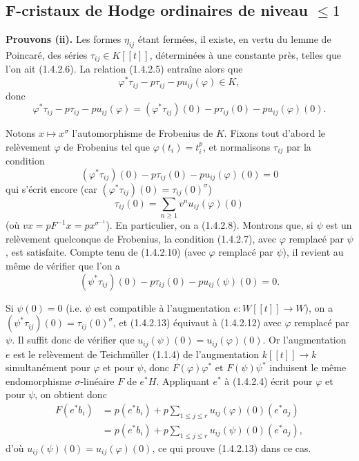 \documentclass[12pt,a4paper]{article}
\theoremstyle{plain}
\theoremstyle{definition}
\theoremstyle{remark}
\begin{document}
\setcounter{section}{1}
\setcounter{subsection}{3}
\setcounter{theorem}{1}

\subsection{F-cristaux de Hodge ordinaires de niveau $\leqslant 1$}

\textbf{Prouvons (ii).} Les formes $\eta_{ij}$ \'etant ferm\'ees, il existe, en vertu du lemme de Poincar\'e, des s\'eries $\tau_{ij} \in K[[t]]$, d\'etermin\'ees \`a une constante pr\`es, telles que l'on ait (1.4.2.6). La relation (1.4.2.5) entra\^ine alors que
\[
\varphi^*\tau_{ij} - p\tau_{ij} - pu_{ij}(\varphi) \in K,
\]
donc
\begin{equation}\tag{1.4.2.10}
\varphi^*\tau_{ij} - p\tau_{ij} - pu_{ij}(\varphi) = (\varphi^*\tau_{ij})(0) - p\tau_{ij}(0) - pu_{ij}(\varphi)(0).
\end{equation}

Notons $x \mapsto x^\sigma$ l'automorphisme de Frobenius de $K$. Fixons tout d'abord le rel\`evement $\varphi$ de Frobenius tel que $\varphi(t_i) = t_i^p$, et normalisons $\tau_{ij}$ par la condition
\begin{equation}\tag{1.4.2.11}
(\varphi^*\tau_{ij})(0) - p\tau_{ij}(0) - pu_{ij}(\varphi)(0) = 0
\end{equation}
qui s'\'ecrit encore (car $(\varphi^*\tau_{ij})(0) = \tau_{ij}(0)^\sigma$)
\begin{equation}\tag{1.4.2.12}
\tau_{ij}(0) = \sum_{n\geqslant 1} v^n u_{ij}(\varphi)(0)
\end{equation}
(o\`u $vx = pF^{-1}x = px^{\sigma^{-1}}$). En particulier, on a (1.4.2.8). Montrons que, si $\psi$ est un rel\`evement quelconque de Frobenius, la condition (1.4.2.7), avec $\varphi$ remplac\'e par $\psi$, est satisfaite. Compte tenu de (1.4.2.10) (avec $\varphi$ remplac\'e par $\psi$), il revient au m\^eme de v\'erifier que l'on a
\begin{equation}\tag{1.4.2.13}
(\psi^*\tau_{ij})(0) - p\tau_{ij}(0) - pu_{ij}(\psi)(0) = 0.
\end{equation}

Si $\psi(0) = 0$ (i.e. $\psi$ est compatible \`a l'augmentation $e : W[[t]] \to W$), on a $(\psi^*\tau_{ij})(0) = \tau_{ij}(0)^\sigma$, et (1.4.2.13) \'equivaut \`a (1.4.2.12) avec $\varphi$ remplac\'e par $\psi$. Il suffit donc de v\'erifier que $u_{ij}(\psi)(0) = u_{ij}(\varphi)(0)$. Or l'augmentation $e$ est le rel\`evement de Teichm\"uller (1.1.4) de l'augmentation $k[[t]] \to k$ simultan\'ement pour $\varphi$ et pour $\psi$, donc $F(\varphi)\varphi^*$ et $F(\psi)\psi^*$ induisent le m\^eme endomorphisme $\sigma$-lin\'eaire $F$ de $e^*H$. Appliquant $e^*$ \`a (1.4.2.4) \'ecrit pour $\varphi$ et pour $\psi$, on obtient donc
\begin{align*}
F(e^*b_i) &= p(e^*b_i) + p\sum_{1\leqslant j\leqslant r} u_{ij}(\varphi)(0)(e^*a_j) \\
&= p(e^*b_i) + p\sum_{1\leqslant j\leqslant r} u_{ij}(\psi)(0)(e^*a_j),
\end{align*}
d'o\`u $u_{ij}(\psi)(0) = u_{ij}(\varphi)(0)$, ce qui prouve (1.4.2.13) dans ce cas.
\end{document}
